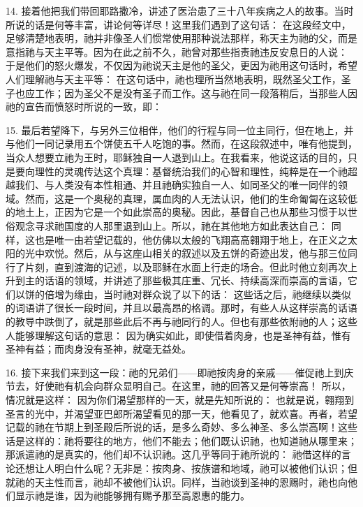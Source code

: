 14. 接着他把我们带回耶路撒冷，讲述了医治患了三十八年疾病之人的故事。当时所说的话是何等丰富，讲论何等详尽！这里我们遇到了这句话： 在这段经文中，足够清楚地表明，祂并非像圣人们惯常使用那种说法那样，称天主为祂的父，而是意指祂与天主平等。因为在此之前不久，祂曾对那些指责祂违反安息日的人说： 于是他们的怒火爆发，不仅因为祂说天主是他的圣父，更因为祂用这句话时，希望人们理解祂与天主平等： 在这句话中，祂也理所当然地表明，既然圣父工作，圣子也应工作；因为圣父不是没有圣子而工作。这与祂在同一段落稍后，当那些人因祂的宣告而愤怒时所说的一致，即：\par

15. 最后若望降下，与另外三位相伴，他们的行程与同一位主同行，但在地上，并与他们一同记录用五个饼使五千人吃饱的事。然而，在这段叙述中，唯有他提到，当众人想要立祂为王时，耶稣独自一人退到山上。在我看来，他说这话的目的，只是要向理性的灵魂传达这个真理：基督统治我们的心智和理性，纯粹是在一个祂超越我们、与人类没有本性相通、并且祂确实独自一人、如同圣父的唯一同伴的领域。然而，这是一个奥秘的真理，属血肉的人无法认识，他们的生命匍匐在这较低的地土上，正因为它是一个如此崇高的奥秘。因此，基督自己也从那些习惯于以世俗观念寻求祂国度的人那里退到山上。所以，祂在其他地方如此表达自己： 同样，这也是唯一由若望记载的，他仿佛以太般的飞翔高高翱翔于地上，在正义之太阳的光中欢悦。然后，从与这座山相关的叙述以及五饼的奇迹出发，他与那三位同行了片刻，直到渡海的记述，以及耶稣在水面上行走的场合。但此时他立刻再次上升到主的话语的领域，并讲述了那些极其庄重、冗长、持续高深而崇高的言语，它们以饼的倍增为缘由，当时祂对群众说了以下的话： 这些话之后，祂继续以类似的词语讲了很长一段时间，并且以最高昂的格调。那时，有些人从这样崇高的话语的教导中跌倒了，就是那些此后不再与祂同行的人。但也有那些依附祂的人；这些人能够理解这句话的意思： 因为确实如此，即使借着肉身，也是圣神有益，惟有圣神有益；而肉身没有圣神，就毫无益处。\par

16. 接下来我们来到这一段：祂的兄弟们——即祂按肉身的亲戚——催促祂上到庆节去，好使祂有机会向群众显明自己。在这里，祂的回答又是何等崇高！ 所以，情况就是这样： 因为你们渴望那样的一天，就是先知所说的： 也就是说，翱翔到圣言的光中，并渴望亚巴郎所渴望看见的那一天，他看见了，就欢喜。再者，若望记载的祂在节期上到圣殿后所说的话，是多么奇妙、多么神圣、多么崇高啊！这些话是这样的：祂将要往的地方，他们不能去；他们既认识祂，也知道祂从哪里来；那派遣祂的是真实的，他们却不认识祂。这几乎等同于祂所说的： 祂借这样的言论还想让人明白什么呢？无非是：按肉身、按族谱和地域，祂可以被他们认识；但就祂的天主性而言，祂却不被他们认识。同样，当祂谈到圣神的恩赐时，祂也向他们显示祂是谁，因为祂能够拥有赐予那至高恩惠的能力。\par

